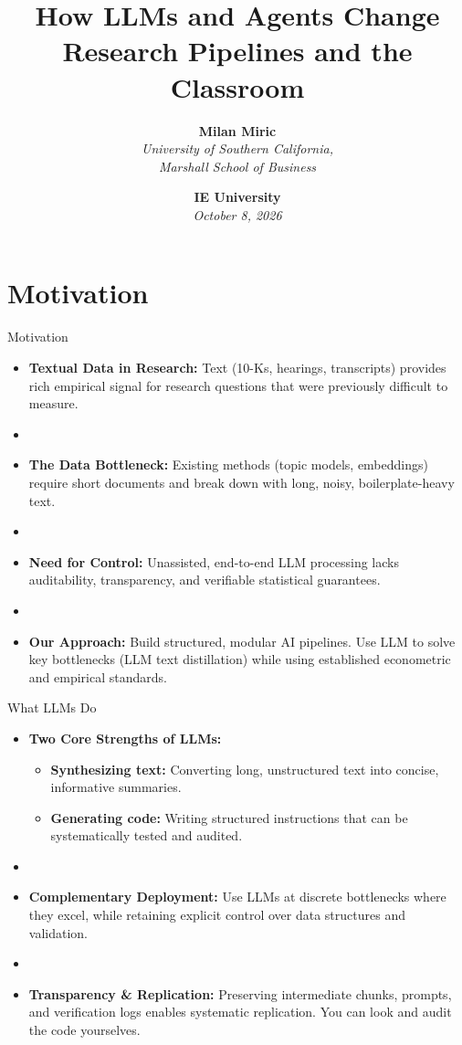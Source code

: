 \documentclass[xcolor=x11names,compress,9pt]{beamer}
\title{\Large How LLMs and Agents Change \\ Research Pipelines and the Classroom}
\date{\textbf{IE University} \\ \vspace{0.2cm} \textit{October 8, 2026}}
\author{\textbf{Milan Miric}\\ 
\textit{University of Southern California, \\ Marshall School of Business}}
\renewcommand{\(}{\begin{columns}}
\renewcommand{\)}{\end{columns}}
\newcommand{\<}[1]{\begin{column}{#1}}
\renewcommand{\>}{\end{column}}
\begin{document}
\begin{frame}
    \titlepage
\end{frame}

\section{Motivation}

\begin{frame}{Motivation}
    \begin{itemize}
        \item \textbf{Textual Data in Research:} Text (10-Ks, hearings, transcripts) provides rich empirical signal for research questions that were previously difficult to measure.
        \item []
        \item \textbf{The Data Bottleneck:} Existing methods (topic models, embeddings) require short documents and break down with long, noisy, boilerplate-heavy text.
        \item []
        \item \textbf{Need for Control:} Unassisted, end-to-end LLM processing lacks auditability, transparency, and verifiable statistical guarantees.
        \item []
        \item \textbf{Our Approach:} Build structured, modular AI pipelines. Use LLM to solve key bottlenecks (LLM text distillation) while using established econometric and empirical standards.
    \end{itemize}
\end{frame}

\begin{frame}{What LLMs Do}
    \begin{itemize}
        \item \textbf{Two Core Strengths of LLMs:}
        \begin{itemize}
            \item \textbf{Synthesizing text:} Converting long, unstructured text into concise, informative summaries.
            \item \textbf{Generating code:} Writing structured instructions that can be systematically tested and audited.
        \end{itemize}
        \item []
        \item \textbf{Complementary Deployment:} Use LLMs at discrete bottlenecks where they excel, while retaining explicit control over data structures and validation.
        \item []
        \item \textbf{Transparency \& Replication:} Preserving intermediate chunks, prompts, and verification logs enables systematic replication. You can look and audit the code yourselves.
    \end{itemize}
\end{frame}
\end{document}
